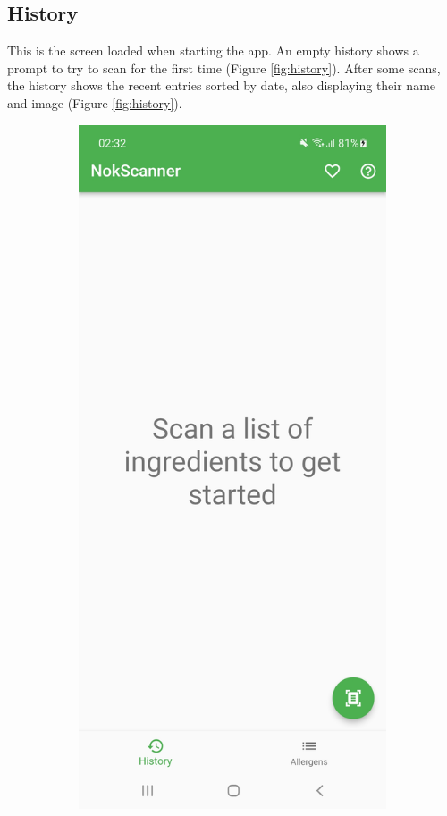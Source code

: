 \subsection{History}

This is the screen loaded when starting the app. An empty history shows a prompt to try to scan for the first time (Figure \ref{fig:history}). After some scans, the history shows the recent entries sorted by date, also displaying their name and image (Figure \ref{fig:history}).

\begin{figure}[h]
    \begin{subfigure}{0.5\textwidth}
        \centering
        \includegraphics[width=0.9\linewidth]{Figures/Screenshot/history_empty.jpg} 

\end{subfigure}
\end{figure}
